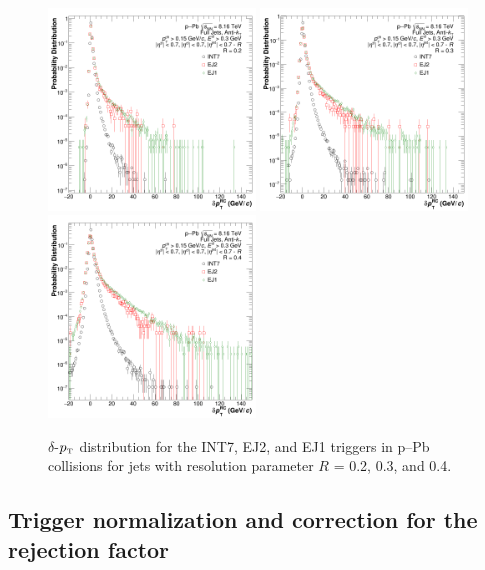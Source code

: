 \documentclass[ALICE]{ALICE_analysis_notes}
\newcommand{\pT}{$p_{\mbox{\tiny T}}$\xspace}
\newcommand{\pPb}{{\mbox{p--Pb}}\xspace}
\begin{document}
\begin{figure}[hbt!]
  \centering
  \includegraphics[width=0.49\textwidth]{figures/pPbFigures/BGSubtraction/plotDpT_R02.png}
  \includegraphics[width=0.49\textwidth]{figures/pPbFigures/BGSubtraction/plotDpT_R03.png}
  \includegraphics[width=0.49\textwidth]{figures/pPbFigures/BGSubtraction/plotDpT_R04.png}
  \caption{$\delta$-\pT distribution for the INT7, EJ2, and EJ1 triggers in \pPb collisions for jets with resolution parameter $R$ = 0.2, 0.3, and 0.4.}
  \label{fig:DeltaPt_distribution}
\end{figure}

\subsection{Trigger normalization and correction for the rejection factor}
\label{sec:triggerCorrection}
\end{document}
